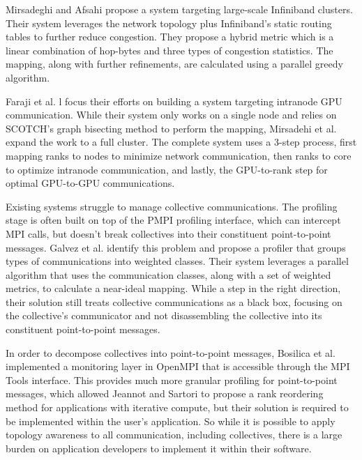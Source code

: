 Mirsadeghi and Afsahi \cite{Mirsadeghi2016PTRAM} propose a system targeting large-scale Infiniband clusters.
Their system leverages the network topology plus Infiniband's static routing tables to further reduce congestion.
They propose a hybrid metric which is a linear combination of hop-bytes and three types of congestion statistics. 
The mapping, along with further refinements, are calculated using a parallel greedy algorithm.

Faraji et al. l \cite{Faraji2016TopoAwareGPUSelection} focus their efforts on building a system targeting intranode GPU communication.
While their system only works on a single node and relies on SCOTCH's \cite{Pellegrini2012SCOTCH} graph bisecting method to perform the mapping, Mirsadehi et al. \cite{Mirsadeghi2016MAGC} expand the work to a full cluster.
The complete system uses a 3-step process, first mapping ranks to nodes to minimize network communication, then ranks to core to optimize intranode communication, and lastly, the GPU-to-rank step for optimal GPU-to-GPU communications.

Existing systems struggle to manage collective communications.
The profiling stage is often built on top of the PMPI profiling interface, which can intercept MPI calls, but doesn't break collectives into their constituent point-to-point messages.
Galvez et al. \cite{Galvez2017AutoTopoMap} identify this problem and propose a profiler that groups types of communications into weighted classes.
Their system leverages a parallel algorithm that uses the communication classes, along with a set of weighted metrics, to calculate a near-ideal mapping.
While a step in the right direction, their solution still treats collective communications as a black box, focusing on the collective's communicator and not disassembling the collective into its constituent point-to-point messages.

In order to decompose collectives into point-to-point messages, Bosilica et al. \cite{Bosilica2017OnlineMonitoringMPI} implemented a monitoring layer in OpenMPI that is accessible through the MPI Tools interface.
This provides much more granular profiling for point-to-point messages, which allowed Jeannot and Sartori \cite{Jeannot2020ImprvMPICommMonitoring} to propose a rank reordering method for applications with iterative compute, but their solution is required to be implemented within the user's application. 
So while it is possible to apply topology awareness to all communication, including collectives, there is a large burden on application developers to implement it within their software.

